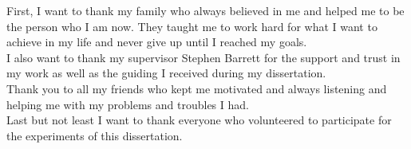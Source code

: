 \documentclass[a4paper, 12pt, oneside]{report}    	%
\begin{document}
\thesistitlepage                                  		%
\thesisdeclarationpage									%
\thesispermissionpage									%

\begin{thesisacknowledgments}               	%
First, I want to thank my family who always believed in me and helped me to be the person who I am now. 
They taught me to work hard for what I want to achieve in my life and never give up until I reached my goals. \\
I also want to thank my supervisor Stephen Barrett for the support and trust in my work as well as the guiding I received during my dissertation. \\
Thank you to all my friends who kept me motivated and always listening and helping me with my problems and troubles I had. \\
Last but not least I want to thank everyone who volunteered to participate for the experiments of this dissertation. 
\end{thesisacknowledgments}                   %
\end{document}
